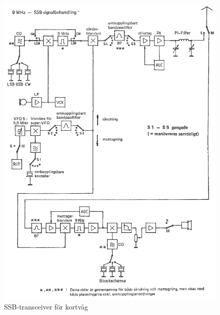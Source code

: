 \begin{figure}
  \includegraphics[width=\textwidth]{images/bild_2_5-14.png}
  \caption{SSB-transceiver för kortvåg}
  \label{fig:bildII5-14}
\end{figure}

